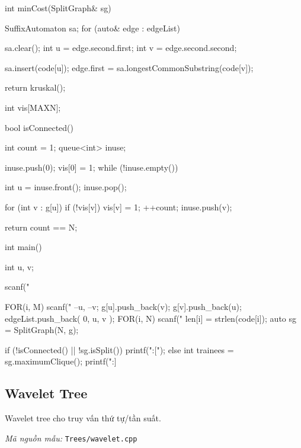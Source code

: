 \documentclass[11pt]{article}
\newcommand{\codepath}[1]{\par\noindent\textit{Mã nguồn mẫu:} \texttt{#1}\par}
\begin{document}
\begin{vncode}
int minCost(SplitGraph& sg) {
	SuffixAutomaton sa;
	for (auto& edge : edgeList){
		sa.clear();
		int u = edge.second.first;
		int v = edge.second.second;

		sa.insert(code[u]);
		edge.first = sa.longestCommonSubstring(code[v]);
	}

	return kruskal();
}

int vis[MAXN];

bool isConnected() {
	int count = 1;
	queue<int> inuse;

	inuse.push(0);
	vis[0] = 1;
	while (!inuse.empty()) {
		int u = inuse.front();
		inuse.pop();

		for (int v : g[u]) {
			if (!vis[v]) {
				vis[v] = 1;
				++count;
				inuse.push(v);
			}
		}
	}
	return count == N;
}

int main() {
	int u, v;

	scanf("%

	FOR(i, M) {
		scanf("%
		--u, --v;
		g[u].push_back(v);
		g[v].push_back(u);
		edgeList.push_back({ 0, {u, v} });
	}
	FOR(i, N) {
		scanf("%
		len[i] = strlen(code[i]);
	}
	auto sg = SplitGraph(N, g);

	if (!isConnected() || !sg.isSplit()) {
		printf(":[\n");
	}
	else {
		int trainees = sg.maximumClique();
		printf(":]\n%
	}
}
\end{vncode}
\endgroup


\subsection{Wavelet Tree}

Wavelet tree cho truy vấn thứ tự/tần suất.

\codepath{Trees/wavelet.cpp}
\end{document}
